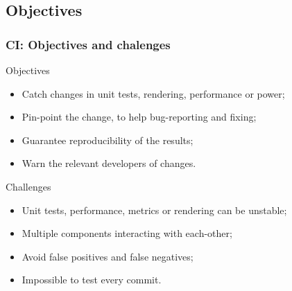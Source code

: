 \documentclass[11pt,english,compress]{beamer}
\begin{document}
\subsection*{Objectives}
\begin{frame}
	\frametitle{CI: Objectives and chalenges}
	
	\begin{block}{Objectives}
		\begin{itemize}
			\item Catch changes in unit tests, rendering, performance or power;
			\item Pin-point the change, to help bug-reporting and fixing;
			\item Guarantee reproducibility of the results;
			\item Warn the relevant developers of changes.
		\end{itemize}
	\end{block}
	
	\pause
	
	\begin{block}{Challenges}
		\begin{itemize}
			\item Unit tests, performance, metrics or rendering can be unstable;
			\item Multiple components interacting with each-other;
			\item Avoid false positives and false negatives;
			\item Impossible to test every commit.
		\end{itemize}
	\end{block}
\end{frame}
\end{document}
